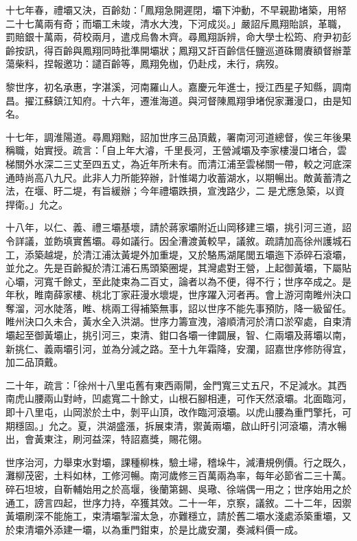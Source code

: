 \begin{pinyinscope}
十七年春，禮壩又決，百齡劾：「鳳翔急開遲閉，壩下沖動，不早親勘堵築，用帑二十七萬兩有奇；而壩工未竣，清水大洩，下河成災。」嚴詔斥鳳翔貽誤，革職，罰賠銀十萬兩，荷校兩月，遣戍烏魯木齊。尋鳳翔訴辨，命大學士松筠、府尹初彭齡按訊，得百齡與鳳翔同時批準開壩狀；鳳翔又訐百齡信任鹽巡道硃爾賡額督辦葦蕩柴料，捏報邀功：譴百齡等，鳳翔免枷，仍赴戍，未行，病歿。

黎世序，初名承惠，字湛溪，河南羅山人。嘉慶元年進士，授江西星子知縣，調南昌。擢江蘇鎮江知府。十六年，遷淮海道。與河督陳鳳翔爭堵倪家灘漫口，由是知名。

十七年，調淮陽道。尋鳳翔黜，詔加世序三品頂戴，署南河河道總督，俟三年後果稱職，始實授。疏言：「自上年大濬，千里長河，王營減壩及李家樓漫口堵合，雲梯關外水深二三丈至四五丈，為近年所未有。而清江浦至雲梯關一帶，較之河底深通時尚高八九尺。此非人力所能猝辦，計惟竭力收蓄湖水，以期暢出。敵黃蓄清之法，在堰、盱二堤，有旨緩辦；今年禮壩跌損，宣洩路少，二是尤應急築，以資捍衛。」允之。

十八年，以仁、義、禮三壩基壞，請於蔣家壩附近山岡移建三壩，挑引河三道，詔令詳議，並飭填實舊壩。尋如議行。因全漕渡黃較早，議敘。疏請加高徐州護城石工，添築越堤，於清江浦汰黃堤外加重堤，又於駱馬湖尾閭五壩迤下添碎石滾壩，並允之。先是百齡擬於清江浦石馬頭築圈堤，其灣處對王營，上起御黃壩，下屬貼心壩，河寬千餘丈，至此陡束為二百丈，論者以為不便，得不行；世序卒成之。是年秋，睢南薛家樓、桃北丁家莊漫水壞堤，世序躍入河者再。會上游河南睢州決口奪溜，河水陡落，睢、桃兩工得補築無事，詔以世序不能先事預防，降一級留任。睢州決口久未合，黃水全入洪湖。世序力籌宣洩，濬順清河於清口淤窄處，自束清壩起至御黃壩止，挑引河三，束清、鉗口各壩一律闢展，智、仁兩壩及蔣壩以南，新挑仁、義兩壩引河，並為分減之路。至十九年霜降，安瀾，詔嘉世序修防得宜，加二品頂戴。

二十年，疏言：「徐州十八里屯舊有東西兩閘，金門寬三丈五尺，不足減水。其西南虎山腰兩山對峙，凹處寬二十餘丈，山根石腳相連，可作天然滾壩。北面臨河，即十八里屯，山岡淤於土中，剝平山頂，改作臨河滾壩。以虎山腰為重門擎托，可期穩固。」允之。夏，洪湖盛漲，拆展束清，禦黃兩壩，啟山盱引河滾壩，清水暢出，會黃東注，刷河益深，特詔嘉獎，賜花翎。

世序治河，力舉束水對壩，課種柳株，驗土埽，稽垛牛，減漕規例價。行之既久，灘柳茂密，土料如林，工修河暢。南河歲修三百萬兩為率，每年必節省二三十萬。碎石坦坡，自靳輔始用之於高堰，後蘭第錫、吳璥、徐端偶一用之；世序始用之於通工，謗言四起，世序力持，卒獲其效。二十一年，京察，議敘。二十二年，因禦黃壩刷深不能施工，束清壩掣溜太急，亦難穩立，請於舊二壩水淺處添築重壩，又於束清壩外添建一壩，以為重門鉗束，於是比歲安瀾，奏減料價一成。


\end{pinyinscope}
